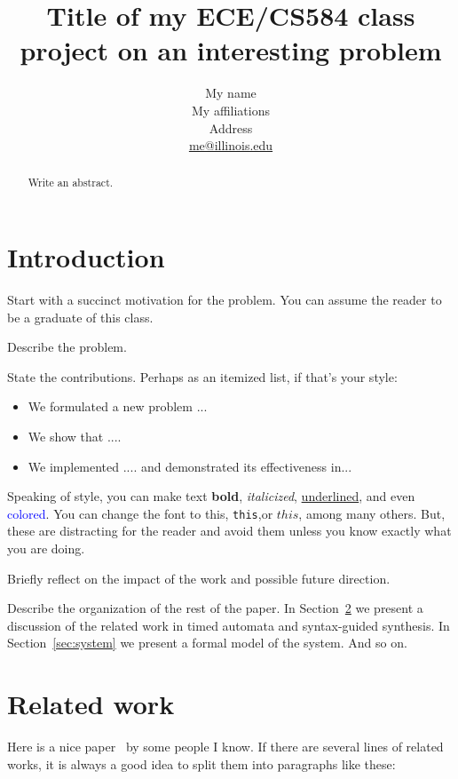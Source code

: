 \documentclass[11pt]{article}
\newcommand{\smallheader}[4]{
  \noindent
  \begin{center}
  \framebox{
    \vbox{
      \hbox to 5.78in { {\bf ECE/CS 584: Embedded and CPS System Verification } \hfill #2 }
      \vspace{2mm}
      \hbox to 5.78in { {\em #3 \hfill #4} }
    }
  }
  \end{center}
  \vspace*{4mm}
}
\newcommand{\homework}[2]{\smallheader{#1}{Fall 2017}{Homework #1}{#2}}
\begin{document}
\title{Title of my ECE/CS584 class project on an interesting problem}
\author{My name\\ 
	My affiliations \\
	Address \\
	\href{mailto:me@illinois.edu}{me@illinois.edu}}
\date{}
\maketitle


\begin{abstract}
	Write an abstract.
\end{abstract}


\section{Introduction}
\label{sec:intro}

Start with a succinct motivation for the problem. You can assume the reader to be a graduate of this class. 

Describe the problem. 

State the contributions. Perhaps as an itemized list, if that's your style:
\begin{itemize}
	\item We formulated a new problem ...
	\item We show that ....
	\item We implemented .... and demonstrated its effectiveness in...
\end{itemize}
Speaking of style, you can make text {\bf bold\/}, {\em italicized\/}, {\underline{underlined}}, and even \textcolor{blue}{colored}. You can change the font to {\sf this}, {\texttt{this}},or $\mathit{this}$, among many others. But, these are distracting for the reader and avoid them unless you know exactly what you are doing.

Briefly reflect on the impact of the work and possible future direction. 

Describe the organization of the rest of the paper. 
In Section~\ref{sec:related} we present a discussion of the related work in timed automata and syntax-guided synthesis. In Section~\ref{sec:system} we present a formal model of the system. And so on.

\section{Related work}
\label{sec:related}
Here is a nice paper~\cite{FanQM017} by some people I know. If there are several lines of related works, it is always a good idea to split them into paragraphs like these:
\end{document}
